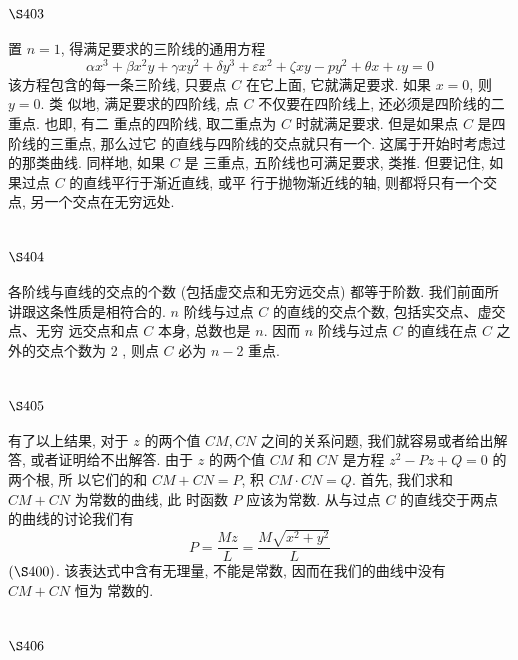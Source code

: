 \section{$\S 403$}

置 $n=1$, 得满足要求的三阶线的通用方程
\[
\alpha x^{3}+\beta x^{2} y+\gamma x y^{2}+\delta y^{3}+\varepsilon x^{2}+\zeta x y-p y^{2}+\theta x+\iota y=0
\]
该方程包含的每一条三阶线, 只要点 $C$ 在它上面, 它就满足要求. 如果 $x=0$, 则 $y=0$. 类 似地, 满足要求的四阶线, 点 $C$ 不仅要在四阶线上, 还必须是四阶线的二重点. 也即, 有二 重点的四阶线, 取二重点为 $C$ 时就满足要求. 但是如果点 $C$ 是四阶线的三重点, 那么过它 的直线与四阶线的交点就只有一个. 这属于开始时考虑过的那类曲线. 同样地, 如果 $C$ 是 三重点, 五阶线也可满足要求, 类推. 但要记住, 如果过点 $C$ 的直线平行于渐近直线, 或平 行于抛物渐近线的轴, 则都将只有一个交点, 另一个交点在无穷远处.

\section{$\S 404$}

各阶线与直线的交点的个数 (包括虚交点和无穷远交点) 都等于阶数. 我们前面所 讲跟这条性质是相符合的. $n$ 阶线与过点 $C$ 的直线的交点个数, 包括实交点、虚交点、无穷 远交点和点 $C$ 本身, 总数也是 $n$. 因而 $n$ 阶线与过点 $C$ 的直线在点 $C$ 之外的交点个数为 2 , 则点 $C$ 必为 $n-2$ 重点.

\section{$\S 405$}

有了以上结果, 对于 $z$ 的两个值 $C M, C N$ 之间的关系问题, 我们就容易或者给出解 答, 或者证明给不出解答. 由于 $z$ 的两个值 $C M$ 和 $C N$ 是方程 $z^{2}-P z+Q=0$ 的两个根, 所 以它们的和 $C M+C N=P$, 积 $C M \cdot C N=Q$. 首先, 我们求和 $C M+C N$ 为常数的曲线, 此 时函数 $P$ 应该为常数. 从与过点 $C$ 的直线交于两点的曲线的讨论我们有
\[
P=\frac{M z}{L}=\frac{M \sqrt{x^{2}+y^{2}}}{L}
\]
$(\S 400)$. 该表达式中含有无理量, 不能是常数, 因而在我们的曲线中没有 $C M+C N$ 恒为 常数的. 

\section{$\S 406$}

